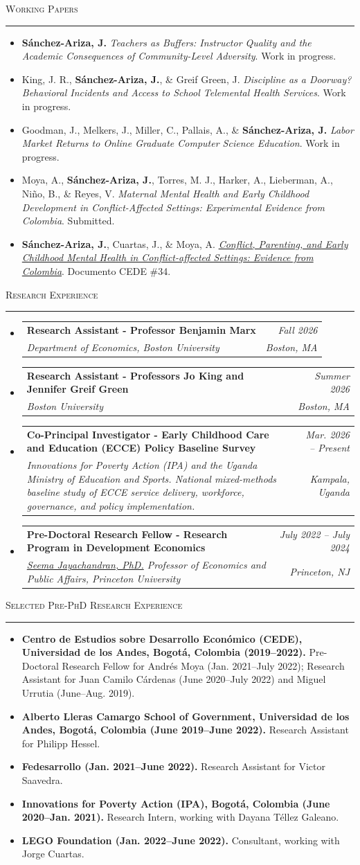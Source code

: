 \documentclass[11pt,letterpaper]{article}
\makeatletter
\newcommand{\cvsection}[1]{%
  \vspace{11pt}%
  {\Large\scshape #1\par}%
  \vspace{3pt}\hrule\vspace{6pt}%
}
\newcommand{\entryliststart}{%
  \begin{itemize}[leftmargin=0.15in,label={},topsep=0pt,partopsep=0pt,
                  itemsep=0pt,parsep=0pt]
}
\newcommand{\entrylistend}{\end{itemize}}
\newcommand{\cventry}[4]{%
  \item
  \begin{tabular*}{0.97\textwidth}[t]{@{}p{0.71\textwidth}@{\extracolsep{\fill}}r@{}}
    {\raggedright\large\bfseries #1} & {\large #2} \\
    {\raggedright\itshape #3} & {\itshape #4} \\
  \end{tabular*}\vspace{2pt}%
}
\newcommand{\cvtextliststart}{%
  \begin{itemize}[leftmargin=0.15in,label={},topsep=0pt,partopsep=0pt,
                  itemsep=0pt,parsep=0pt]
}
\newcommand{\cvtextitem}[1]{\item #1\vspace{3pt}}
\newcommand{\cvtextlistend}{\end{itemize}}
\makeatother
\begin{document}
\cvsection{Working Papers}
\cvtextliststart
  \cvtextitem{\textbf{S\'anchez-Ariza, J.} \textit{Teachers as Buffers: Instructor Quality and the Academic Consequences of Community-Level Adversity}. Work in progress.}
  \cvtextitem{King, J. R., \textbf{S\'anchez-Ariza, J.}, \& Greif Green, J. \textit{Discipline as a Doorway? Behavioral Incidents and Access to School Telemental Health Services}. Work in progress.}
  \cvtextitem{Goodman, J., Melkers, J., Miller, C., Pallais, A., \& \textbf{S\'anchez-Ariza, J.} \textit{Labor Market Returns to Online Graduate Computer Science Education}. Work in progress.}
  \cvtextitem{Moya, A., \textbf{S\'anchez-Ariza, J.}, Torres, M. J., Harker, A., Lieberman, A., Ni\~no, B., \& Reyes, V. \textit{Maternal Mental Health and Early Childhood Development in Conflict-Affected Settings: Experimental Evidence from Colombia}. Submitted.}
  \cvtextitem{\textbf{S\'anchez-Ariza, J.}, Cuartas, J., \& Moya, A. \href{https://papers.ssrn.com/sol3/papers.cfm?abstract_id=4230362}{\textit{Conflict, Parenting, and Early Childhood Mental Health in Conflict-affected Settings: Evidence from Colombia}}. Documento CEDE \#34.}
\cvtextlistend

\cvsection{Research Experience}
\entryliststart
  \cventry{Research Assistant - Professor Benjamin Marx}{\textit{Fall 2026}}
    {Department of Economics, Boston University}
    {Boston, MA}
  \cventry{Research Assistant - Professors Jo King and Jennifer Greif Green}{\textit{Summer 2026}}
    {Boston University}
    {Boston, MA}
  \cventry{Co-Principal Investigator - Early Childhood Care and Education (ECCE) Policy Baseline Survey}{\textit{Mar. 2026 -- Present}}
    {Innovations for Poverty Action (IPA) and the Uganda Ministry of Education and Sports. National mixed-methods baseline study of ECCE service delivery, workforce, governance, and policy implementation.}
    {Kampala, Uganda}
  \cventry{Pre-Doctoral Research Fellow - Research Program in Development Economics}{\textit{July 2022 -- July 2024}}
    {\href{https://seemajayachandran.com/}{Seema Jayachandran, PhD.} Professor of Economics and Public Affairs, Princeton University}
    {Princeton, NJ}
\entrylistend

\cvsection{Selected Pre-PhD Research Experience}
\cvtextliststart
  \cvtextitem{\textbf{Centro de Estudios sobre Desarrollo Econ\'omico (CEDE), Universidad de los Andes, Bogot\'a, Colombia (2019--2022).} Pre-Doctoral Research Fellow for Andr\'es Moya (Jan. 2021--July 2022); Research Assistant for Juan Camilo C\'ardenas (June 2020--July 2022) and Miguel Urrutia (June--Aug. 2019).}
  \cvtextitem{\textbf{Alberto Lleras Camargo School of Government, Universidad de los Andes, Bogot\'a, Colombia (June 2019--June 2022).} Research Assistant for Philipp Hessel.}
  \cvtextitem{\textbf{Fedesarrollo (Jan. 2021--June 2022).} Research Assistant for Victor Saavedra.}
  \cvtextitem{\textbf{Innovations for Poverty Action (IPA), Bogot\'a, Colombia (June 2020--Jan. 2021).} Research Intern, working with Dayana T\'ellez Galeano.}
  \cvtextitem{\textbf{LEGO Foundation (Jan. 2022--June 2022).} Consultant, working with Jorge Cuartas.}
\cvtextlistend
\end{document}
